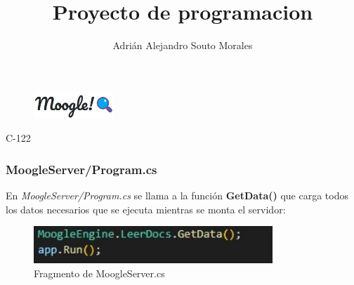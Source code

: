 \documentclass{beamer}
\title{Proyecto de programacion}
\author{Adrián Alejandro Souto Morales}
\begin{document}
    \begin{frame}
        \begin{figure}
            \centering
            \includegraphics[width = 3cm]{img/searchbar.png}
        \end{figure}
        \maketitle
        C-122
    \end{frame}
    \begin{frame}
        \frametitle{MoogleServer/Program.cs}
        En \textit{MoogleServer/Program.cs} se llama a la función \textbf{GetData()} que carga todos los datos necesarios que se ejecuta mientras se monta el servidor:
    \\
        \begin{figure}[h]
            \centering
            \includegraphics[width = 9cm]{img/MoogleServer.jpg}
            \caption[]{Fragmento de MoogleServer.cs}
        \end{figure}
        
    \end{frame}
\end{document}
